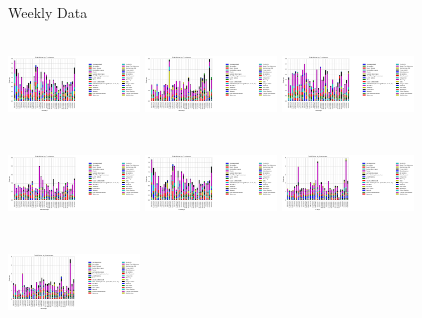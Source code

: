\documentclass[compress,blue]{beamer}
\begin{document}
\begin{frame}{Weekly Data}
\begin{rows}
\row{\textwidth}
\includegraphics[width=3.5cm,height=2.5cm]{RevenueSundays}
\includegraphics[width=3.5cm,height=2.5cm]{RevenueMondays}
\includegraphics[width=3.5cm,height=2.5cm]{RevenueTuesdays}
\row{\textwidth}
\includegraphics[width=3.5cm,height=2.5cm]{RevenueWednesdays}
\includegraphics[width=3.5cm,height=2.5cm]{RevenueThursdays}
\includegraphics[width=3.5cm,height=2.5cm]{RevenueFridays}
\row{\textwidth}
\hspace*{3.45cm}
\includegraphics[width=3.5cm,height=2.5cm]{RevenueSaturdays}
\end{rows}
\end{frame}
\end{document}
